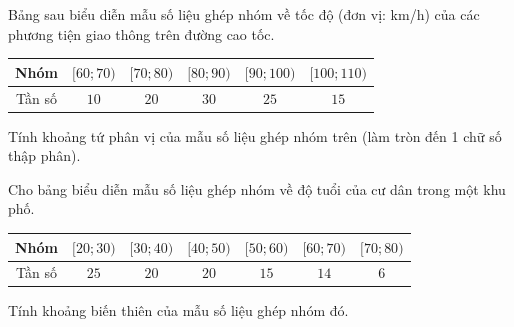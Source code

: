 \begin{ex}%
	Bảng sau biểu diễn mẫu số liệu ghép nhóm về tốc độ (đơn vị: km/h) của các phương tiện giao thông trên đường cao tốc.
	\begin{center}
		\begin{tabular}{|c|c|c|c|c|c|}
			\hline Nhóm  & $[60 ; 70)$ & $[70 ; 80)$ & $[80 ; 90)$ & $[90 ; 100)$ & $[100 ; 110)$ \\
			\hline Tần số & $10$ & $20$ & $30$ & $25$ & $15$ \\
			\hline
		\end{tabular}
	\end{center}
	Tính khoảng tứ phân vị của mẫu số liệu ghép nhóm trên (làm tròn đến 1 chữ số thập phân).
\end{ex}
\begin{ex}%
	Cho bảng biểu diễn mẫu số liệu ghép nhóm về độ tuổi của cư dân trong một khu phố.
	\begin{center}    
		\begin{tabular}{|c|c|c|c|c|c|c|}
			\hline 
			Nhóm & $[20 ; 30)$& $[30 ; 40)$ & $[40 ; 50)$ & $[50 ; 60)$& $[60 ; 70)$ & $[70 ; 80)$ \\ 
			\hline 
			Tần số & $25$ &$20$&$20$ &$15$&$14$&$6$ \\
			\hline
		\end{tabular}
	\end{center}
	Tính khoảng biến thiên của mẫu số liệu ghép nhóm đó.
\end{ex}
